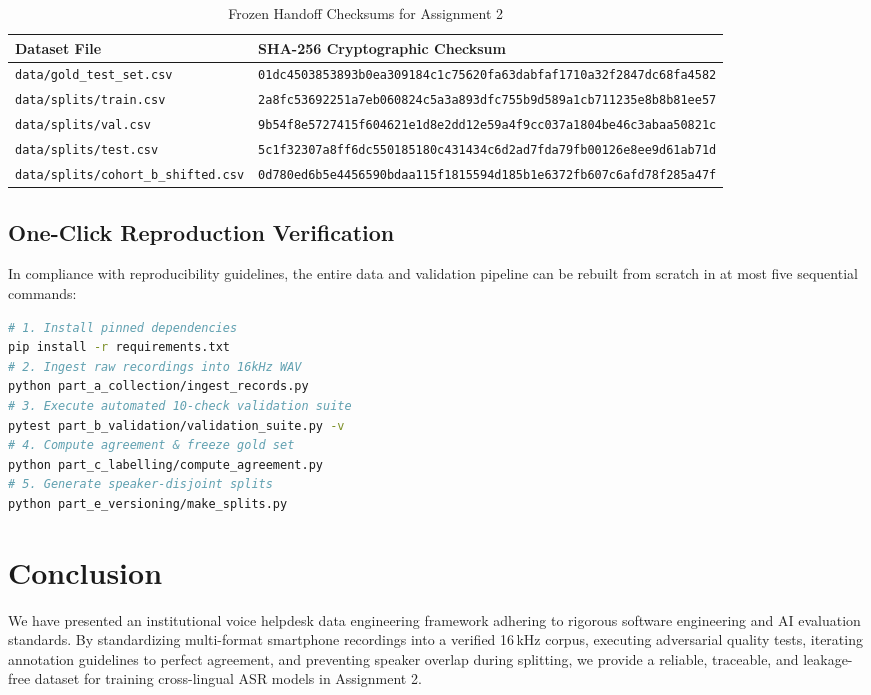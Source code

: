 \documentclass[10pt,journal,compsoc]{IEEEtran}
\begin{document}
\begin{table}[h]
\centering
\caption{Frozen Handoff Checksums for Assignment 2}
\label{tab:handoff_hashes}
\begin{tabular}{lp{4.2cm}}
\toprule
\textbf{Dataset File} & \textbf{SHA-256 Cryptographic Checksum} \\
\midrule
\texttt{data/gold\_test\_set.csv} & \texttt{01dc4503853893b0ea309184c1c75620fa63dabfaf1710a32f2847dc68fa4582} \\
\texttt{data/splits/train.csv} & \texttt{2a8fc53692251a7eb060824c5a3a893dfc755b9d589a1cb711235e8b8b81ee57} \\
\texttt{data/splits/val.csv} & \texttt{9b54f8e5727415f604621e1d8e2dd12e59a4f9cc037a1804be46c3abaa50821c} \\
\texttt{data/splits/test.csv} & \texttt{5c1f32307a8ff6dc550185180c431434c6d2ad7fda79fb00126e8ee9d61ab71d} \\
\texttt{data/splits/cohort\_b\_shifted.csv} & \texttt{0d780ed6b5e4456590bdaa115f1815594d185b1e6372fb607c6afd78f285a47f} \\
\bottomrule
\end{tabular}
\end{table}

\subsection{One-Click Reproduction Verification}
In compliance with reproducibility guidelines, the entire data and validation pipeline can be rebuilt from scratch in at most five sequential commands:
\begin{lstlisting}[language=bash,basicstyle=\ttfamily\scriptsize]
# 1. Install pinned dependencies
pip install -r requirements.txt
# 2. Ingest raw recordings into 16kHz WAV
python part_a_collection/ingest_records.py
# 3. Execute automated 10-check validation suite
pytest part_b_validation/validation_suite.py -v
# 4. Compute agreement & freeze gold set
python part_c_labelling/compute_agreement.py
# 5. Generate speaker-disjoint splits
python part_e_versioning/make_splits.py
\end{lstlisting}

\section{Conclusion}
We have presented an institutional voice helpdesk data engineering framework adhering to rigorous software engineering and AI evaluation standards. By standardizing multi-format smartphone recordings into a verified 16\,kHz corpus, executing adversarial quality tests, iterating annotation guidelines to perfect agreement, and preventing speaker overlap during splitting, we provide a reliable, traceable, and leakage-free dataset for training cross-lingual ASR models in Assignment 2.
\end{document}
